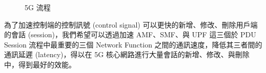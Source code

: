 \begin{figure}[htbp]
  \centering
  \caption[5G 流程]{{\footnotesize 5G 流程~\cite{3gpp.23.502}}}
  \label{fig:5g_procedure}
\end{figure}


為了加速控制端的控制訊號 (control signal) 可以更快的新增、修改、刪除用戶端的會話 (session)，我們希望可以透過加速 AMF、SMF、與 UPF 這三個於 PDU Session 流程中最重要的三個 Network Function 之間的通訊速度，降低其三者間的通訊延遲 (latency)，得以在 5G 核心網路進行大量會話的新增、修改、與刪除中，得到最好的效能。

